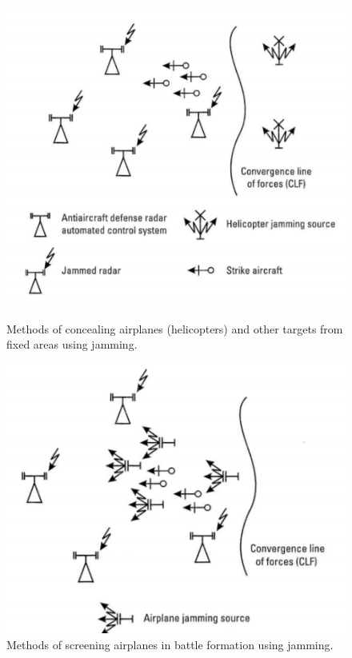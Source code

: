 \documentclass[english,purist]{ist-report}
\begin{document}
\begin{figure}[ht]
    \begin{minipage}[c]{0.49\textwidth}
        \captionsetup{width = 0.9\linewidth}
        \centering
        \includegraphics[width=\linewidth]{jam2.png}
        \caption{Methods of concealing airplanes (helicopters) and other targets from fixed areas using jamming.}
        \label{jam2}
    \end{minipage}
    \hfill
    \begin{minipage}[c]{0.49\textwidth}
        \captionsetup{width = 0.9\linewidth}
        \centering
        \includegraphics[width=\linewidth]{jam3.png}
        \caption{Methods of screening airplanes in battle formation using jamming.}
        \label{jam3}
    \end{minipage}
\end{figure}
\end{document}
